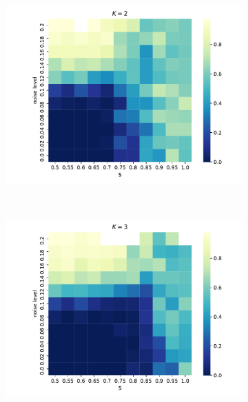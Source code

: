 \documentclass[11pt,letterpaper]{article}
\begin{document}
\begin{figure}[t!]
  \centering
      \begin{subfigure}[t]{0.49\textwidth}
          \centering
          \includegraphics[width=\textwidth]{Figures/p_v_noise_k=2.pdf}
          \caption{}
      \end{subfigure}
      ~
      \begin{subfigure}[t]{0.49\textwidth}
          \centering
          \includegraphics[width=\textwidth]{Figures/p_v_noise_k=3.pdf}
          \caption{}
      \end{subfigure} \\
      \begin{subfigure}[t]{0.49\textwidth}
          \centering

\end{subfigure}
\end{figure}
\end{document}
